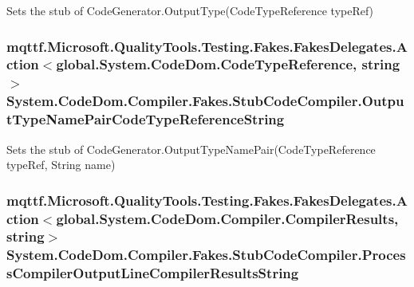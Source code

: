 Sets the stub of Code\-Generator.\-Output\-Type(\-Code\-Type\-Reference type\-Ref)

\hypertarget{class_system_1_1_code_dom_1_1_compiler_1_1_fakes_1_1_stub_code_compiler_ac2e9a22a788c70aff90fcdcdf51a6be9}{
\subsubsection[{Output\-Type\-Name\-Pair\-Code\-Type\-Reference\-String}]{\setlength{\rightskip}{0pt plus 5cm}mqttf.\-Microsoft.\-Quality\-Tools.\-Testing.\-Fakes.\-Fakes\-Delegates.\-Action$<$global.\-System.\-Code\-Dom.\-Code\-Type\-Reference, string$>$ System.\-Code\-Dom.\-Compiler.\-Fakes.\-Stub\-Code\-Compiler.\-Output\-Type\-Name\-Pair\-Code\-Type\-Reference\-String}}\label{class_system_1_1_code_dom_1_1_compiler_1_1_fakes_1_1_stub_code_compiler_ac2e9a22a788c70aff90fcdcdf51a6be9}


Sets the stub of Code\-Generator.\-Output\-Type\-Name\-Pair(\-Code\-Type\-Reference type\-Ref, String name)

\hypertarget{class_system_1_1_code_dom_1_1_compiler_1_1_fakes_1_1_stub_code_compiler_ab8c7db030d2db9648fc0194fba2a7b71}{
\subsubsection[{Process\-Compiler\-Output\-Line\-Compiler\-Results\-String}]{\setlength{\rightskip}{0pt plus 5cm}mqttf.\-Microsoft.\-Quality\-Tools.\-Testing.\-Fakes.\-Fakes\-Delegates.\-Action$<$global.\-System.\-Code\-Dom.\-Compiler.\-Compiler\-Results, string$>$ System.\-Code\-Dom.\-Compiler.\-Fakes.\-Stub\-Code\-Compiler.\-Process\-Compiler\-Output\-Line\-Compiler\-Results\-String}}\label{class_system_1_1_code_dom_1_1_compiler_1_1_fakes_1_1_stub_code_compiler_ab8c7db030d2db9648fc0194fba2a7b71}


